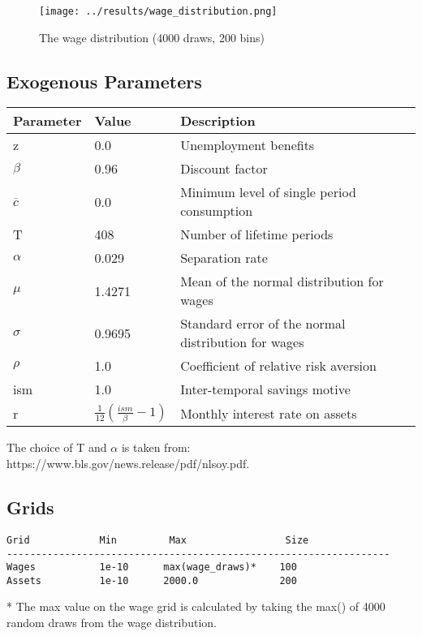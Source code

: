 \documentclass[12pt]{article}
\begin{document}
\begin{figure}[hbt!]
\centering
\texttt{[image: ../results/wage\_distribution.png]}
\caption{The wage distribution (4000 draws, 200 bins)}
\label{fig:wage_distribution}
\end{figure}

\subsection{Exogenous Parameters}


\begin{tabular}{ |l l l| }
 \hline
 Parameter &  Value & Description \\ [0.5ex]
 \hline
 z & 0.0 & Unemployment benefits \\
$\beta$ & 0.96 & Discount factor \\
$\overline{c}$ & 0.0 & Minimum level of single period consumption \\
T & 408 & Number of lifetime periods \\
$\alpha$ & 0.029 & Separation rate \\
$\mu$ & 1.4271 & Mean of the normal distribution for wages \\
$\sigma$ & 0.9695 & Standard error of the normal distribution for wages \\
$\rho$ & 1.0 & Coefficient of relative risk aversion \\
ism & 1.0 & Inter-temporal savings motive \\
r & $\frac{1}{12} (\frac{ism}{\beta} - 1)$ & Monthly interest rate on assets \\ [1ex]
 \hline
\end{tabular}

\vspace{5mm}
The choice of T and $\alpha$ is taken from: https://www.bls.gov/news.release/pdf/nlsoy.pdf.

\subsection{Grids}
\begin{Verbatim}[frame = single, fontsize = \footnotesize]
Grid            Min         Max                 Size
------------------------------------------------------------------
Wages           1e-10      max(wage_draws)*    100
Assets          1e-10      2000.0              200
\end{Verbatim}

* The max value on the wage grid is calculated by taking the max() of 4000 random draws from the wage distribution.
\end{document}
